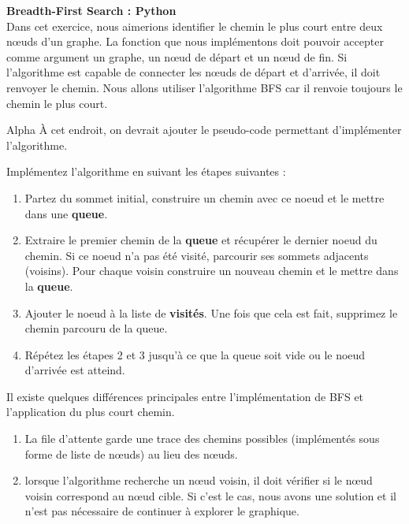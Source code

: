 \begin{Exercice}[15 minutes]\textbf{Breadth-First Search : Python
}\\
	Dans cet exercice, nous aimerions identifier le chemin le plus court entre deux nœuds d'un graphe.
	La fonction que nous implémentons doit pouvoir accepter comme argument un graphe, un nœud de départ et un nœud de fin. Si l'algorithme est capable de connecter les nœuds 			de départ et d'arrivée, il doit renvoyer le chemin. Nous allons utiliser l'algorithme BFS car il renvoie toujours le chemin le plus court.\\
	\begin{note}{Alpha}
		À cet endroit, on devrait ajouter le pseudo-code permettant d'implémenter l'algorithme.
	\end{note}
	    Implémentez l'algorithme en suivant les étapes suivantes :\\
	\begin{enumerate}
	    
		\item Partez du sommet initial, construire un chemin avec ce noeud et le mettre dans une \textbf{queue}.
		\item Extraire le premier chemin de la \textbf{queue} et récupérer le dernier noeud du chemin. Si ce noeud n'a pas été visité, parcourir ses sommets adjacents (voisins). Pour chaque voisin construire un nouveau chemin et le mettre dans la \textbf{queue}.
		\item Ajouter le noeud à la liste de  \textbf{visités}. Une fois que cela est fait, supprimez le chemin  parcouru de la queue.
		\item Répétez les étapes 2 et 3 jusqu'à ce que la queue soit vide ou le noeud d'arrivée est atteind.\\
	\end{enumerate}

	
    	\begin{conseil}
		Il existe quelques différences principales entre l'implémentation de BFS et  l'application du plus court chemin.
        		\begin{enumerate}
			\item La file d'attente garde une trace des chemins possibles (implémentés sous forme de liste de nœuds) au lieu des nœuds.
	           	\item lorsque l'algorithme recherche un nœud voisin, il doit vérifier si le nœud voisin correspond au nœud cible. Si c'est le cas, nous avons une solution et il n'est pas 					nécessaire de continuer à explorer le graphique.
        		\end{enumerate}

    	\end{conseil}

	\begin{solution}
		
	\end{solution}
\end{Exercice}

